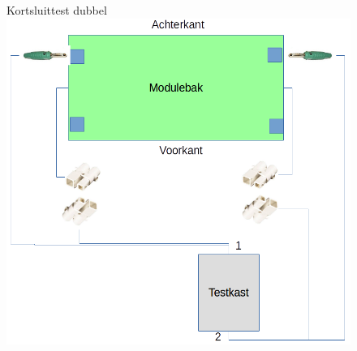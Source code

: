 \documentclass[12pt,a4paper]{report}
\begin{document}
\begin{figure}[!ht]
  \captionbox
  {Kortsluittest dubbel\label{im:test_dubbel}}
  {\includegraphics[scale=0.8]{images/rcu_test_dubbel}\\}
\end{figure}
\end{document}
